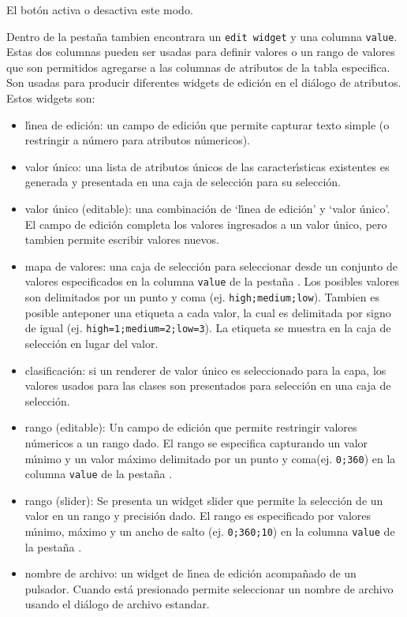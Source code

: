 El bot\'on  activa o desactiva este modo.


Dentro de la pesta\~na  tambien encontrara un \texttt{edit widget} y una columna 
\texttt{value}. Estas dos columnas pueden ser usadas para definir valores o un rango 
de valores que son permitidos agregarse a las columnas de atributos de la tabla especifica. 
Son usadas para producir diferentes widgets de edici\'on en el di\'alogo de atributos. Estos 
widgets son:

\begin{itemize}
\item l\'{\i}nea de edici\'on: un campo de edici\'on que permite capturar texto simple (o restringir a 
n\'umero para atributos n\'umericos).
\item valor \'unico: una lista de atributos \'unicos de las caracter\'{\i}sticas existentes
es generada y presentada en una caja de selecci\'on para su selecci\'on.
\item  valor  \'unico (editable): una combinaci\'on de `l\'{\i}nea de edici\'on' y `valor \'unico'.
El campo de edici\'on completa los valores ingresados a un valor \'unico, pero tambien permite
escribir valores nuevos.
\item mapa de valores: una caja de selecci\'on para seleccionar desde un conjunto de valores especificados en la
columna \texttt{value} de la pesta\~na .  Los posibles valores son 
delimitados por un punto y coma (ej. \verb|high;medium;low|). Tambien es posible
anteponer una etiqueta a cada valor, la cual es delimitada por signo de igual (ej.
\verb|high=1;medium=2;low=3|). La etiqueta se muestra en la caja de selecci\'on en lugar
del valor.
\item clasificaci\'on: si un renderer de valor \'unico es seleccionado para la capa, los valores
usados para las clases son presentados para selecci\'on en una caja de selecci\'on.
\item rango (editable): Un campo de edici\'on que permite restringir valores n\'umericos a un
rango dado.  El rango se especifica capturando un valor m\'{\i}nimo y un valor m\'aximo
delimitado por un punto y coma(ej. \verb|0;360|) en la columna \texttt{value} de
la pesta\~na .
\item rango (slider): Se presenta un widget slider que permite la selecci\'on de un valor
en un rango y precisi\'on dado.  El rango es especificado por valores m\'{\i}nimo, m\'aximo
y un ancho de salto (ej. \verb|0;360;10|) en la columna \texttt{value} de
la pesta\~na .
\item nombre de archivo: un widget de l\'{\i}nea de edici\'on acompa\~nado de un pulsador. Cuando est\'a
presionado permite seleccionar un nombre de archivo usando el di\'alogo de archivo estandar.
\end{itemize}

